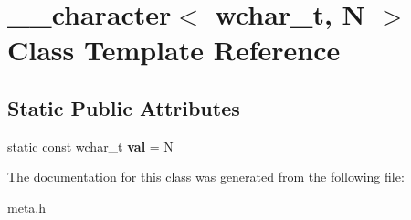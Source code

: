 \hypertarget{class____character_3_01wchar__t_00_01_n_01_4}{\section{\+\_\+\+\_\+character$<$ wchar\+\_\+t, N $>$ Class Template Reference}
\label{class____character_3_01wchar__t_00_01_n_01_4}
}
\subsection*{Static Public Attributes}
\begin{DoxyCompactItemize}
\item 
\hypertarget{class____character_3_01wchar__t_00_01_n_01_4_af52a2c23ca5da64696e808e6f115f53d}{static const wchar\+\_\+t {\bfseries val} = N}\label{class____character_3_01wchar__t_00_01_n_01_4_af52a2c23ca5da64696e808e6f115f53d}

\end{DoxyCompactItemize}


The documentation for this class was generated from the following file\+:\begin{DoxyCompactItemize}
\item 
meta.\+h\end{DoxyCompactItemize}
